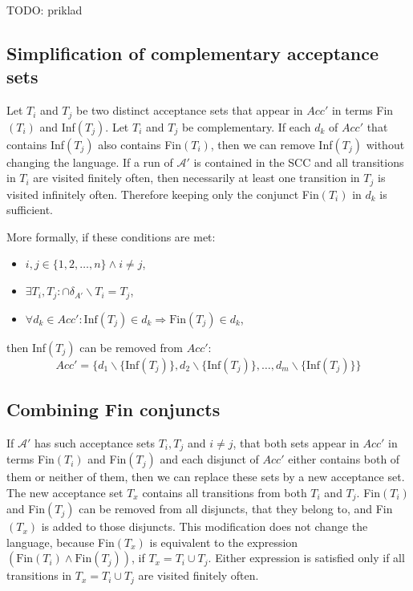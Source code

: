 \documentclass[
  digital, %
  twoside, %
  table,   %
  lof,     %
  lot,     %
]{fithesis3}
\begin{document}
TODO: priklad

\subsection{Simplification of complementary acceptance sets}
Let $T_i$ and $T_j$ be two distinct acceptance sets that appear in $Acc'$ in terms Fin$(T_i)$ and Inf$(T_j)$. Let $T_i$ and $T_j$ be complementary. If each $d_k$ of $Acc'$ that contains Inf$(T_j)$ also contains Fin$(T_i)$, then we can remove Inf$(T_j)$ without changing the language. If a run of $\mathcal{A'}$ is contained in the SCC and all transitions in $T_i$ are visited finitely often, then necessarily at least one transition in $T_j$ is visited infinitely often. Therefore keeping only the conjunct Fin$(T_i)$ in $d_k$ is sufficient. 

More formally, if these conditions are met:
\begin{itemize}
  \item $i, j \in \{1, 2, \dots, n\} \wedge i \neq j$,
  \item $\exists T_i, T_j \colon \cap \delta_{A'} \smallsetminus T_i = T_j$,
  \item $\forall d_k \in Acc' \colon \text{Inf}(T_j) \in d_k \Rightarrow \text{Fin}(T_j) \in d_k$,
\end{itemize}
then Inf$(T_j)$ can be removed from $Acc'$:
\begin{equation*}
  Acc' = \{d_1 \smallsetminus \{\text{Inf}(T_j)\}, d_2 \smallsetminus \{\text{Inf}(T_j)\}, \dots, d_m \smallsetminus \{\text{Inf}(T_j)\} \}
\end{equation*}

\subsection{Combining Fin conjuncts}
If $\mathcal{A'}$ has such acceptance sets $T_i, T_j$ and $i \neq j$, that both sets appear in $Acc'$ in terms Fin$(T_i)$ and Fin$(T_j)$ and each disjunct of $Acc'$ either contains both of them or neither of them, then we can replace these sets by a new acceptance set. The new acceptance set $T_x$ contains all transitions from both $T_i$ and $T_j$. Fin$(T_i)$ and Fin$(T_j)$ can be removed from all disjuncts, that they belong to, and Fin$(T_x)$ is added to those disjuncts. This modification does not change the language, because Fin$(T_x)$ is equivalent to the expression $(\text{Fin}(T_i) \wedge \text{Fin}(T_j))$, if $T_x = T_i \cup T_j$. Either expression is satisfied only if all transitions in $T_x = T_i \cup T_j$ are visited finitely often.
\end{document}
